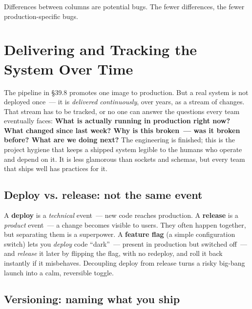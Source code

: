 Differences between columns are potential bugs. The fewer differences, the fewer production-specific bugs.

\setcounter{section}{10}
\section{Delivering and Tracking the System Over Time}\label{39-local-vs-production:3911-delivering-and-tracking-the-system-over-time}

The pipeline in §39.8 promotes one image to production. But a real system is not deployed once~--- it is \emph{delivered continuously}, over years, as a stream of changes. That stream has to be tracked, or no one can answer the questions every team eventually faces: \textbf{What is actually running in production right now? What changed since last week? Why is this broken~--- was it broken before? What are we doing next?} The engineering is finished; this is the project hygiene that keeps a shipped system legible to the humans who operate and depend on it. It is less glamorous than sockets and schemas, but every team that ships well has practices for it.

\subsection*{Deploy vs. release: not the same event}\label{39-local-vs-production:deploy-vs-release-not-the-same-event}

A \textbf{deploy} is a \emph{technical} event~--- new code reaches production. A \textbf{release} is a \emph{product} event~--- a change becomes visible to users. They often happen together, but separating them is a superpower. A \textbf{feature flag} (a simple configuration switch) lets you \emph{deploy} code ``dark''~--- present in production but switched off~--- and \emph{release} it later by flipping the flag, with no redeploy, and roll it back instantly if it misbehaves. Decoupling deploy from release turns a risky big-bang launch into a calm, reversible toggle.

\subsection*{Versioning: naming what you ship}\label{39-local-vs-production:versioning-naming-what-you-ship}

